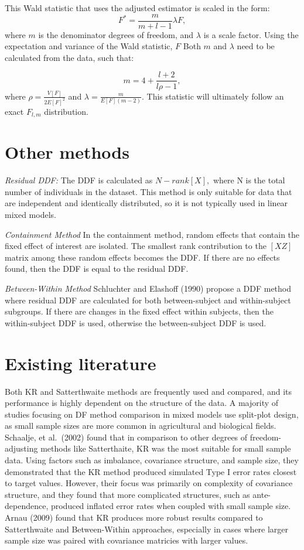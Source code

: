 \documentclass[12pt, twoside]{amherstthesis}
\begin{document}
This Wald statistic that uses the adjusted estimator is scaled in the form: \[F^* = \frac{m}{m+l-1}\lambda F,\] where \(m\) is the denominator degrees of freedom, and \(\lambda\) is a scale factor. Using the expectation and variance of the Wald statistic, \(F\) Both \(m\) and \(\lambda\) need to be calculated from the data, such that:

\[m = 4 + \frac{l+2}{l\rho-1},\] where \(\rho = \frac{V[F]}{2E[F]^2}\) and
\(\lambda = \frac{m}{E[F](m-2)}.\) This statistic will ultimately follow an exact \(F_{l,m}\) distribution.

\hypertarget{other-methods}{%
\section{Other methods}\label{other-methods}}

\emph{Residual DDF:} The DDF is calculated as \(N-rank[X],\) where N is the total number of individuals in the dataset. This method is only suitable for data that are independent and identically distributed, so it is not typically used in linear mixed models.

\emph{Containment Method}
In the containment method, random effects that contain the fixed effect of interest are isolated. The smallest rank contribution to the \([X Z]\) matrix among these random effects becomes the DDF. If there are no effects found, then the DDF is equal to the residual DDF.

\emph{Between-Within Method}
Schluchter and Elashoff (1990) propose a DDF method where residual DDF are calculated for both between-subject and within-subject subgroups. If there are changes in the fixed effect within subjects, then the within-subject DDF is used, otherwise the between-subject DDF is used.

\hypertarget{existing-literature}{%
\section{Existing literature}\label{existing-literature}}

Both KR and Satterthwaite methods are frequently used and compared, and its performance is highly dependent on the structure of the data.
A majority of studies focusing on DF method comparison in mixed models use split-plot design, as small sample sizes are more common in agricultural and biological fields. Schaalje, et al.~(2002) found that in comparison to other degrees of freedom-adjusting methods like Satterthaite, KR was the most suitable for small sample data. Using factors such as imbalance, covariance structure, and sample size, they demonstrated that the KR method produced simulated Type I error rates closest to target values. However, their focus was primarily on complexity of covariance structure, and they found that more complicated structures, such as ante-dependence, produced inflated error rates when coupled with small sample size. Arnau (2009) found that KR produces more robust results compared to Satterthwaite and Between-Within approaches, especially in cases where larger sample size was paired with covariance matricies with larger values.
\end{document}
